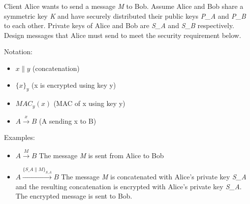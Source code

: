 \documentclass[addpoints]{exam}
\begin{document}
\begin{questions}
\begin{parts}
\end{parts}

\pagebreak


Client Alice wants to send a message \textit{M} to Bob. Assume Alice
and Bob share a symmetric key \textit{K} and have securely distributed
their public keys \textit{P\_A} and \textit{P\_B} to each
other. Private keys of Alice and Bob are \textit{S\_A} and
\textit{S\_B} respectively. Design messages that Alice must send to
meet the security requirement below.

Notation: 
\begin{itemize}
\item $x \parallel y$ (concatenation) 
\item $\{x\}_y$ (x is encrypted using key y) 
\item $MAC_y(x)$ (MAC of x using key y) 
\item $A \xrightarrow{x} B$ (A sending x to B)
\end{itemize}

Examples:
\begin{itemize}
\item $A \xrightarrow{M} B$ The message \textit{M} is sent from Alice to Bob
\item $A \xrightarrow{\{S\_A \parallel M\}_{S\_A}} B$ The message
  \textit{M} is concatenated with Alice's private key \textit{S\_A}
  and the resulting concatenation is encrypted with Alice's private
  key \textit{S\_A}. The encrypted message is sent to Bob.
\end{itemize}

\end{questions}
\end{document}
